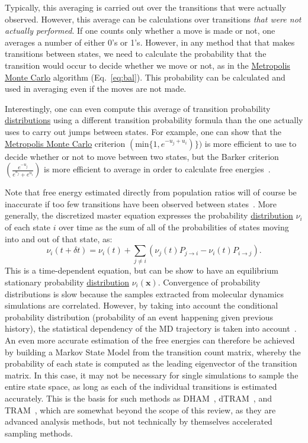 \documentclass[9pt,review]{livecoms}
\newcommand{\vx}{\mathbf{x}}
\begin{document}
Typically, this averaging is carried out over the transitions that were actually observed. However, this average can be calculations over transitions \emph{that were not actually performed}. If one counts only whether a move is made or not, one averages a number of either 0's or 1's. However, in any method that that makes transitions between states, we need to calculate the probability that the transition would occur to decide whether we move or not, as in the \hyperlink{ref:MetropolisMonteCarlo} {Metropolis Monte Carlo} algorithm (Eq.~\ref{eq:bal}).  This probability can be calculated and used in averaging even if the moves are not made. 

Interestingly, one can even compute this average of transition probability \hyperlink{ref:Distribution} {distributions} using a different transition probability formula than the one actually uses to carry out jumps between states. For example, one can show that the \hyperlink{ref:MetropolisMonteCarlo} {Metropolis Monte Carlo} criterion $(\mathrm{min} \{1,e^{-u_j+u_i})\})$ is more efficient to use to decide whether or not to move between two states, but the Barker criterion $\left(\frac{e^{-u_j}}{e^{u_j}+e^{u_i}}\right)$ is more efficient to average in order to calculate free energies~\citep{Liu:Biometrika:1996}.

Note that free energy estimated directly from population ratios will of course be inaccurate if too few transitions have been observed between states~\cite{No2009}.  More generally, the discretized master equation expresses the probability \hyperlink{ref:Distribution} {distribution} $\nu_i$ of each state $i$ over time as the sum of all of the probabilities of states moving into and out of that state, as:
\begin{equation}
   \nu_i(t + \delta t) = \nu_i(t) + \sum_{j \neq i} (\nu_j(t) P_{j\rightarrow i} - \nu_i(t) P_{i\rightarrow j}).
   \label{eq:master_equation}
\end{equation}
This is a time-dependent equation, but can be show to have an equilibrium stationary probability \hyperlink{ref:Distribution} {distribution} $\nu_i(\vx)$. Convergence of probability distributions is slow because the samples extracted from molecular dynamics simulations are correlated. However, by taking into account the conditional probability distribution (probability of an event happening given previous history), the statistical dependency of the MD trajectory is taken into account~\cite{Wu:JCP:2014,Wu:MMS:2014,Rosta2014,Wu:PNAS:2016a}. 
An even more accurate estimation of the free energies can therefore be achieved by building a Markov State Model from the transition count matrix, whereby the probability of each state is computed as the leading eigenvector of the transition matrix. In this case, it may not be necessary for single simulations to sample the entire state space, as long as each of the individual transitions is estimated accurately.  This is the basis for such methods as DHAM~\cite{Rosta2014}, dTRAM~\cite{Wu:JCP:2014,Wu:MMS:2014}, and TRAM~\cite{Wu:PNAS:2016a}, which are somewhat beyond the scope of this review, as they are advanced analysis methods, but not technically by themselves accelerated sampling methods.
\end{document}

